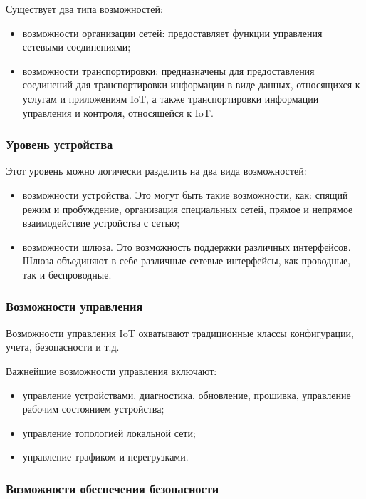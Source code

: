 Существует два типа возможностей:

\begin{itemize}
	\item возможности организации сетей: предоставляет функции управления сетевыми соединениями;
	\item возможности транспортировки: предназначены для предоставления соединений для транспортировки информации в виде данных, относящихся к услугам и приложениям IoT, а также транспортировки информации управления и контроля, относящейся к IoT.
\end{itemize}

\subsubsection{Уровень устройства}

Этот уровень можно логически разделить на два вида возможностей:
\begin{itemize}
	\item возможности устройства. Это могут быть такие возможности, как: спящий режим и пробуждение, организация специальных сетей, прямое и непрямое взаимодействие устройства с сетью;
	\item возможности шлюза. Это возможность поддержки различных интерфейсов. Шлюза объединяют в себе различные сетевые интерфейсы, как проводные, так и беспроводные.
\end{itemize}

\subsubsection{Возможности управления}

Возможности управления IoT охватывают традиционные классы конфигурации, учета, безопасности и т.д.

Важнейшие возможности управления включают:
\begin{itemize}
	\item управление устройствами, диагностика, обновление, прошивка, управление рабочим состоянием устройства;
	\item управление топологией локальной сети;
	\item управление трафиком и перегрузками.
\end{itemize}

\subsubsection{Возможности обеспечения безопасности}

